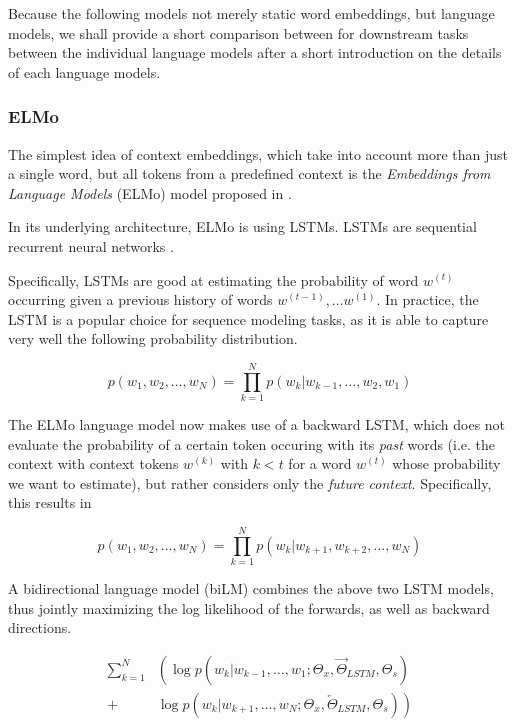 \documentclass[a4paper,12pt,twoside,openright]{report}
\begin{document}
Because the following models not merely static word embeddings, but language models, we shall provide a short comparison between for downstream tasks between the individual language models after a short introduction on the details of each language models.

\subsubsection{ELMo}

The simplest idea of context embeddings, which take into account more than just a single word, but all tokens from a predefined context is the \textit{Embeddings from Language Models} (ELMo) model proposed in \cite{peters17}.

In its underlying architecture, ELMo is using LSTMs.
LSTMs are sequential recurrent neural networks .

Specifically, LSTMs \cite{hochreiter97} are good at estimating the probability of word $w^{(t)}$ occurring given a previous history of words $w^{(t-1)}, \ldots w^{(1)}$.
In practice, the LSTM is a popular choice for sequence modeling tasks, as it is able to capture very well the following probability distribution.

\begin{equation}
p\left(w_{1},  w_{2}, \ldots, w_{N} \right)=\prod_{k=1}^{N} p\left(w_{k} | w_{k-1}, \ldots, w_{2}, w_{1}\right)
\end{equation}

The ELMo language model now makes use of a backward LSTM, which does not evaluate the probability of a certain token occuring with its \textit{past} words (i.e. the context with context tokens $w^{(k)}$ with $k < t$ for a word $w^{(t)}$ whose probability we want to estimate), but rather considers only the \textit{future context}.
Specifically, this results in 

\begin{equation}
p\left(w_{1},  w_{2}, \ldots, w_{N} \right)=\prod_{k=1}^{N} p\left(w_{k} | w_{k+1}, w_{k+2}, \ldots, w_{N}\right)
\end{equation}

A bidirectional language model (biLM) combines the above two LSTM models, thus jointly maximizing the log likelihood of the forwards, as well as backward directions.

\begin{align} 
\sum_{k=1}^{N} &\left(\log p\left(w_{k} | w_{k-1}, \ldots, w_{1} ; \Theta_{x}, \vec{\Theta}_{L S T M}, \Theta_{s}\right)\right.\\
+&\left.\log p\left(w_{k} | w_{k+1}, \ldots, w_{N}; \Theta_{x}, \overleftarrow{\Theta}_{L S T M}, \Theta_{s}\right)\right) 
\end{align}
\end{document}
